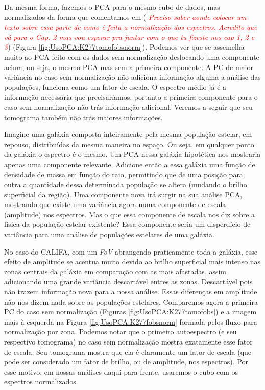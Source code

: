 Da mesma forma, fazemos o PCA para o mesmo cubo de dados, mas normalizados da forma que comentamos em \fixme ({\it
\textcolor{red}{Preciso saber aonde colocar um texto sobre essa parte de como é feita a normalização dos espectros.
Acredito que vá para o Cap. 2 mas vou esperar pra juntar com o que tu fizeste nos cap 1, 2 e 3}}) (Figura
\ref{fig:UsoPCA:K277tomofobsnorm}). Podemos ver que se assemelha muito ao PCA feito com os dados sem normalização
deslocando uma componente acima, ou seja, o mesmo PCA mas sem a primeira componente. A PC de maior variância no caso sem
normalização não adiciona informação alguma a análise das populações, funciona como um fator de escala. O espectro médio
já é a informação necessária que precisaríamos, portanto a primeira componente para o caso sem normalização não trás
informação adicional. Veremos a seguir que seu tomograma também não trás maiores informações.

Imagine uma galáxia composta inteiramente pela mesma população estelar, em repouso, distribuídas da mesma maneira no
espaço. Ou seja, em qualquer ponto da galáxia o espectro é o mesmo. Um PCA nessa galáxia hipotética nos mostraria apenas
uma componente relevante. Adicione então a essa galáxia uma função de densidade de massa em função do raio, permitindo
que de uma posição para outra a quantidade dessa determinada população se altera (mudando o brilho superficial da
região). Uma componente nova irá surgir na sua análise PCA, mostrando que existe uma variância agora numa componente de
escala (amplitude) nos espectros. Mas o que essa componente de escala nos diz sobre a física da população estelar
existente? Essa componente seria um disperdício de variância para uma análise de populações estelares de uma galáxia.

No caso do CALIFA, com um {\em FoV} abrangendo praticamente toda a galáxia, esse efeito de amplitude se acentua muito
devido ao brilho superficial \ojo mais intenso nas zonas centrais da galáxia em comparação com as mais afastadas, assim
adicionando uma grande variância descartável entres as zonas. Descartável pois não trazem informação nova para a nossa
análise. Essas diferenças em amplitude não nos dizem nada sobre as populações estelares. Comparemos agora a primeira
PC do caso sem normalização (Figuras \ref{fig:UsoPCA:K277tomofobs}) e a imagem mais à esquerda na Figura
\ref{fig:UsoPCA:K277fobsnorm} formada pelos fluxo para normalização por zona. Podemos notar que o primeiro autoespectro
(e seu respectivo tomograma) no caso sem normalização mostra exatamente esse fator de escala. Seu tomograma mostra que
ela é claramente um fator de escala (que pode ser considerado um fator de brilho, ou de amplitude, nos espectros). Por
esse motivo, em nossas análises daqui para frente, usaremos o cubo com os espectros normalizados.

